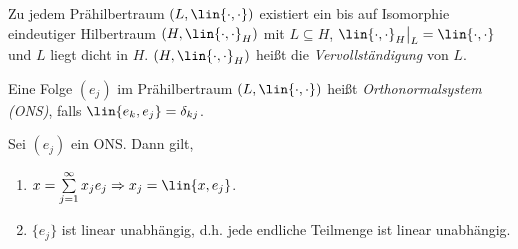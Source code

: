 \begin{prop}
\label{prop:1.7}
Zu jedem Prähilbertraum $(L,\lin{\cdot,\cdot})$ existiert ein bis auf
Isomorphie eindeutiger Hilbertraum $(H,\lin{\cdot,\cdot}_H)$ mit $L\subseteq
H$, $\lin{\cdot,\cdot}_H\big|_L = \lin{\cdot,\cdot}$ und $L$ liegt dicht in
$H$.
$(H,\lin{\cdot,\cdot}_H)$ heißt die \emph{Vervollständigung} von $L$.\fishhere
\end{prop}

\begin{defn}
\label{defn:1.8}
Eine Folge $(e_j)$ im Prähilbertraum $(L,\lin{\cdot,\cdot})$ heißt
\emph{Orthonormalsystem (ONS)}, falls $\lin{e_k,e_j} = \delta_{kj}$.\fishhere
\end{defn}

\begin{prop}
\label{prop:1.9}
Sei $(e_j)$ ein ONS. Dann gilt,
\begin{enumerate}
  \item $x=\sum\limits_{j=1}^\infty x_j e_j \Rightarrow x_j = \lin{x,e_j}$.
  \item $\{e_j\}$ ist linear unabhängig, d.h. jede endliche Teilmenge ist
  linear unabhängig.\fishhere
\end{enumerate}
\end{prop}

